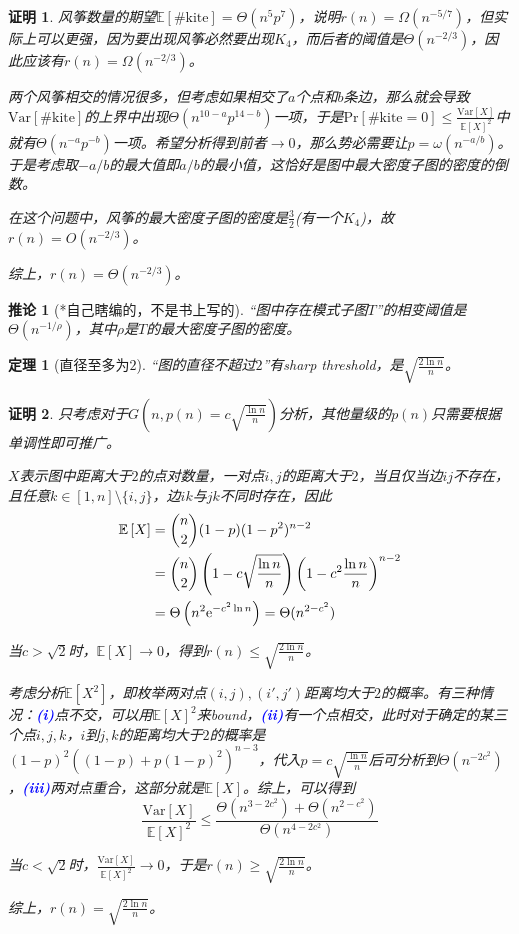 \documentclass[8pt]{article}
\theoremstyle{compact}
\newtheorem{theorem}{定理}
\newtheorem{corollary}{推论}
\newtheorem{Proof}{证明}
\def\num#1{\textnormal{\textbf{\mbox{\textcolor{blue}{(#1)}}}}}
\def\le{\leqslant}
\def\ge{\geqslant}
\def\Pr#1{\text{Pr}\left[{#1}\right]}
\def\E#1{\mathbb{E}\left[{#1}\right]}
\def\Var#1{\text{Var}\left[{#1}\right]}
\begin{document}
\begin{Proof}
	风筝数量的期望$\E{\#\text{kite}} = \Theta(n^5p^7)$，说明$r(n) = \Omega(n^{-5/7})$，但实际上可以更强，因为要出现风筝必然要出现$K_4$，而后者的阈值是$\Theta(n^{-2/3})$，因此应该有$r(n) = \Omega(n^{-2/3})$。
	
	两个风筝相交的情况很多，但考虑如果相交了$a$个点和$b$条边，那么就会导致$\Var{\#\text{kite}}$的上界中出现$\Theta(n^{10-a}p^{14-b})$一项，于是$\Pr{\#\text{kite} = 0} \le \frac{\Var{X}}{\E{X}^2}$中就有$\Theta(n^{-a}p^{-b})$一项。希望分析得到前者$\to 0$，那么势必需要让$p = \omega(n^{-a/b})$。于是考虑取$-a/b$的最大值即$a/b$的最小值，这恰好是图中最大密度子图的密度的倒数。
	
	在这个问题中，风筝的最大密度子图的密度是$\frac32$(有一个$K_4$)，故$r(n) = O(n^{-2/3})$。
	
	综上，$r(n) = \Theta(n^{-2/3})$。
\end{Proof}
\begin{corollary}[*自己瞎编的，不是书上写的]
	“图中存在模式子图$T$”的相变阈值是$\Theta(n^{-1/\rho})$，其中$\rho$是$T$的最大密度子图的密度。
\end{corollary}

\begin{theorem}[直径至多为$2$]
	“图的直径不超过$2$”有sharp threshold，是$\sqrt{\frac{2\ln n}{n}}$。
\end{theorem}
\begin{Proof}
	只考虑对于$G\left(n, p(n) = c\sqrt{\frac{\ln n}{n}}\right)$分析，其他量级的$p(n)$只需要根据单调性即可推广。
	
	$X$表示图中距离大于$2$的点对数量，一对点$i, j$的距离大于$2$，当且仅当边$ij$不存在，且任意$k \in [1, n] \setminus \{i, j\}$，边$ik$与$jk$不同时存在，因此
	\begin{equation}
	\begin{split}
	\E{X} &= \binom{n}{2}(1-p)(1-p^2)^{n-2} \\&= \binom{n}{2}\left(1 - c\sqrt{\frac{\ln n}{n}}\right)\left(1 - c^2\frac{\ln n}{n}\right)^{n-2} \\&= \Theta\left(n^2\text e^{-c^2\ln n}\right) = \Theta(n^{2 - c^2})
	\end{split}
	\end{equation}
	
	当$c > \sqrt 2$时，$\E{X} \to 0$，得到$r(n) \le \sqrt{\frac{2\ln n}{n}}$。
	
	考虑分析$\E{X^2}$，即枚举两对点$(i, j), (i', j')$距离均大于$2$的概率。有三种情况：\num{i}点不交，可以用$\E{X}^2$来bound，\num{ii}有一个点相交，此时对于确定的某三个点$i, j, k$，$i$到$j, k$的距离均大于$2$的概率是$(1-p)^2\left((1-p) + p(1-p)^2\right)^{n-3}$，代入$p = c\sqrt{\frac{\ln n}{n}}$后可分析到$\Theta(n^{-2c^2})$，\num{iii}两对点重合，这部分就是$\E{X}$。综上，可以得到
	\begin{equation}
		\frac{\Var{X}}{\E{X}^2} \le \frac{\Theta(n^{3-2c^2}) + \Theta(n^{2-c^2})}{\Theta(n^{4 - 2c^2})}
	\end{equation}
	
	当$c < \sqrt 2$时，$\frac{\Var{X}}{\E{X}^2} \to 0$，于是$r(n) \ge \sqrt{\frac{2\ln n}{n}}$。
	
	综上，$r(n) = \sqrt{\frac{2\ln n}{n}}$。
\end{Proof}
\end{document}
